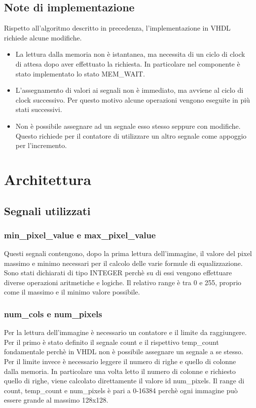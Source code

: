 \documentclass{article}
\begin{document}
\subsection{Note di implementazione}
Rispetto all'algoritmo descritto in precedenza, l'implementazione in VHDL richiede alcune modifiche.
\begin{itemize}
    \item La lettura dalla memoria non è istantanea, ma necessita di un ciclo di clock di attesa dopo aver effettuato la richiesta. In particolare nel componente è stato implementato lo stato MEM\_WAIT.
    \item L'assegnamento di valori ai segnali non è immediato, ma avviene al ciclo di clock successivo. Per questo motivo alcune operazioni vengono eseguite in più stati successivi.
    \item Non è possibile assegnare ad un segnale esso stesso seppure con modifiche. Questo richiede per il contatore di utilizzare un altro segnale come appoggio per l'incremento.
\end{itemize}

\pagebreak

\section{Architettura}
\subsection{Segnali utilizzati}
\subsubsection{min\_pixel\_value e max\_pixel\_value}
Questi segnali contengono, dopo la prima lettura dell'immagine, il valore del pixel massimo e minimo necessari per il calcolo delle varie formule di equalizzazione. Sono stati dichiarati di tipo INTEGER perchè su di essi vengono effettuare diverse operazioni aritmetiche e logiche. Il relativo range è tra 0 e 255, proprio come il massimo e il minimo valore possibile.

\subsubsection{num\_cols e num\_pixels}
Per la lettura dell'immagine è necessario un contatore e il limite da raggiungere. Per il primo è stato definito il segnale count e il rispettivo temp\_count fondamentale perchè in VHDL non è possibile assegnare un segnale a se stesso. Per il limite invece è necessario leggere il numero di righe e quello di colonne dalla memoria. In particolare una volta letto il numero di colonne e richiesto quello di righe, viene calcolato direttamente il valore id num\_pixels. Il range di count, temp\_count e num\_pixels è pari a 0-16384 perchè ogni immagine può essere grande al massimo 128x128.
\end{document}
